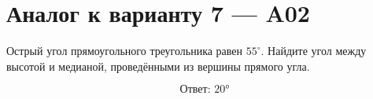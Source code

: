 


\section*{Аналог к варианту 7 — A02}
Острый угол прямоугольного треугольника равен \(55^\circ\). Найдите угол между высотой и медианой, проведёнными из вершины прямого угла.
\begin{center}\end{center}
\[\boxed{\text{Ответ: }20°}\]

